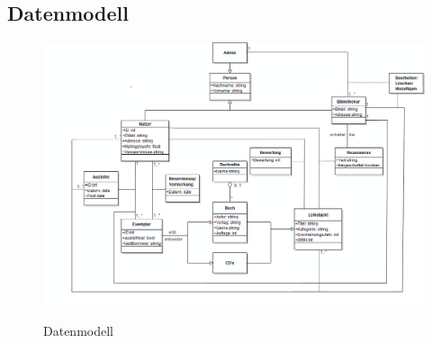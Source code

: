 \documentclass[fontsize=12pt,paper=a4,twoside]{scrartcl}
\begin{document}
\subsection{Datenmodell}

\begin{figure}[h]
\caption{Datenmodell}
\includegraphics[width=1\textwidth]{UML_Black1.png}
  \label{datenmodell}
\end{figure}
\end{document}
